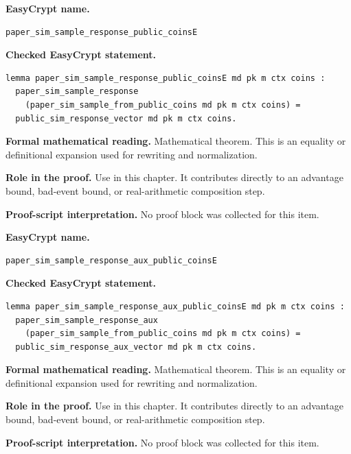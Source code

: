 \begin{formaltheorem}
\noindent\textbf{EasyCrypt name.}
\begin{lstlisting}[language=EasyCrypt,basicstyle=\ttfamily\scriptsize]
paper_sim_sample_response_public_coinsE
\end{lstlisting}
\noindent\textbf{Checked EasyCrypt statement.}
\begin{lstlisting}[language=EasyCrypt,basicstyle=\ttfamily\scriptsize]
lemma paper_sim_sample_response_public_coinsE md pk m ctx coins :
  paper_sim_sample_response
    (paper_sim_sample_from_public_coins md pk m ctx coins) =
  public_sim_response_vector md pk m ctx coins.
\end{lstlisting}
\noindent\textbf{Formal mathematical reading.}
Mathematical theorem. This is an equality or definitional expansion used for rewriting and normalization.

\noindent\textbf{Role in the proof.}
Use in this chapter. It contributes directly to an advantage bound, bad-event bound, or real-arithmetic composition step.

\noindent\textbf{Proof-script interpretation.}
No proof block was collected for this item.

\end{formaltheorem}

\begin{formaltheorem}
\noindent\textbf{EasyCrypt name.}
\begin{lstlisting}[language=EasyCrypt,basicstyle=\ttfamily\scriptsize]
paper_sim_sample_response_aux_public_coinsE
\end{lstlisting}
\noindent\textbf{Checked EasyCrypt statement.}
\begin{lstlisting}[language=EasyCrypt,basicstyle=\ttfamily\scriptsize]
lemma paper_sim_sample_response_aux_public_coinsE md pk m ctx coins :
  paper_sim_sample_response_aux
    (paper_sim_sample_from_public_coins md pk m ctx coins) =
  public_sim_response_aux_vector md pk m ctx coins.
\end{lstlisting}
\noindent\textbf{Formal mathematical reading.}
Mathematical theorem. This is an equality or definitional expansion used for rewriting and normalization.

\noindent\textbf{Role in the proof.}
Use in this chapter. It contributes directly to an advantage bound, bad-event bound, or real-arithmetic composition step.

\noindent\textbf{Proof-script interpretation.}
No proof block was collected for this item.

\end{formaltheorem}

